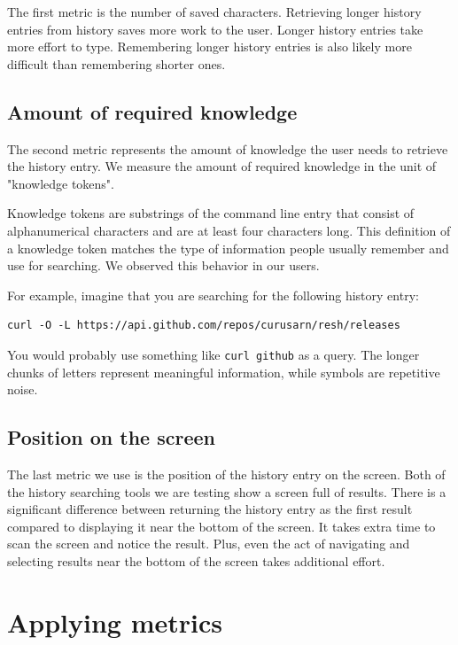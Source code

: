 The first metric is the number of saved characters. Retrieving longer history entries from history saves more work to the user. Longer history entries take more effort to type. Remembering longer history entries is also likely more difficult than remembering shorter ones. 

\subsection{Amount of required knowledge}\label{knowledge-tokens}

The second metric represents the amount of knowledge the user needs to retrieve the history entry. We measure the amount of required knowledge in the unit of "knowledge tokens".

Knowledge tokens are substrings of the command line entry that consist of alphanumerical characters and are at least four characters long. This definition of a knowledge token matches the type of information people usually remember and use for searching. We observed this behavior in our users. 

\newpage 
For example, imagine that you are searching for the following history entry:
\begin{verbatim}
curl -O -L https://api.github.com/repos/curusarn/resh/releases 
\end{verbatim}

You would probably use something like \verb|curl github| as a query. The longer chunks of letters represent meaningful information, while symbols are repetitive noise.

\subsection{Position on the screen}

The last metric we use is the position of the history entry on the screen. Both of the history searching tools we are testing show a screen full of results. There is a significant difference between returning the history entry as the first result compared to displaying it near the bottom of the screen. It takes extra time to scan the screen and notice the result. Plus, even the act of navigating and selecting results near the bottom of the screen takes additional effort.

\section{Applying metrics}

